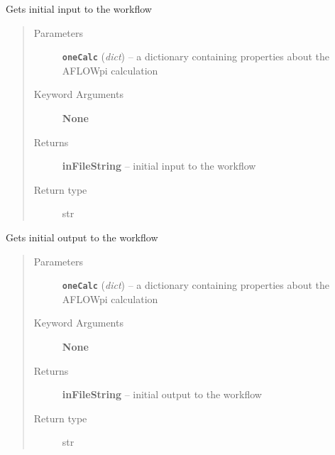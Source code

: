 \documentclass[letterpaper,10pt,english]{sphinxmanual}
\begin{document}

\begin{fulllineitems}
\label{retr:retr.__getInitialInputString}
Gets initial input to the workflow
\begin{quote}\begin{description}
\item[{Parameters}] \leavevmode
\textbf{\texttt{oneCalc}} (\emph{dict}) -- a dictionary containing properties about the AFLOWpi calculation

\item[{Keyword Arguments}] \leavevmode
\textbf{None}

\item[{Returns}] \leavevmode
\textbf{inFileString} --
initial input to the workflow

\item[{Return type}] \leavevmode
str

\end{description}\end{quote}

\end{fulllineitems}


\begin{fulllineitems}
\label{retr:retr.__getInitialOutputString}
Gets initial output to the workflow
\begin{quote}\begin{description}
\item[{Parameters}] \leavevmode
\textbf{\texttt{oneCalc}} (\emph{dict}) -- a dictionary containing properties about the AFLOWpi calculation

\item[{Keyword Arguments}] \leavevmode
\textbf{None}

\item[{Returns}] \leavevmode
\textbf{inFileString} --
initial output to the workflow

\item[{Return type}] \leavevmode
str

\end{description}\end{quote}

\end{fulllineitems}
\end{document}
